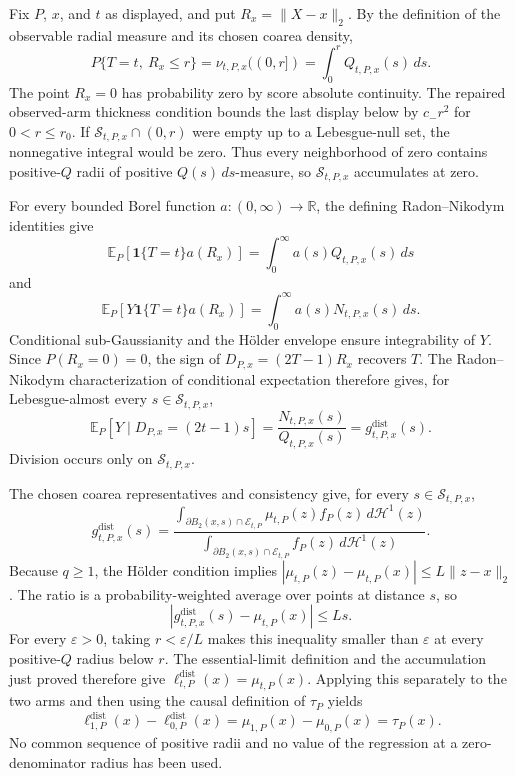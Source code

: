 Fix \(P\), \(x\), and \(t\) as displayed, and put
\(R_x=\lVert X-x\rVert_2\).  By the definition of the observable radial
measure and its chosen coarea density,
\[
 P\{T=t,\ R_x\leq r\}=\nu_{t,P,x}((0,r])
 =\int_0^rQ_{t,P,x}(s)\,ds.
\]
The point \(R_x=0\) has probability zero by score absolute continuity.  The
repaired observed-arm thickness condition bounds the last display below by
\(c_-r^2\) for \(0<r\leq r_0\).  If
\(\mathcal S_{t,P,x}\cap(0,r)\) were empty up to a Lebesgue-null set, the
nonnegative integral would be zero.  Thus every neighborhood of zero contains
positive-\(Q\) radii of positive \(Q(s)\,ds\)-measure, so
\(\mathcal S_{t,P,x}\) accumulates at zero.

For every bounded Borel function \(a:(0,\infty)\to\mathbb R\), the defining
Radon--Nikodym identities give
\[
 \mathbb E_P[\mathbf1\{T=t\}a(R_x)]
 =\int_0^\infty a(s)Q_{t,P,x}(s)\,ds
\]
and
\[
 \mathbb E_P[Y\mathbf1\{T=t\}a(R_x)]
 =\int_0^\infty a(s)N_{t,P,x}(s)\,ds.
\]
Conditional sub-Gaussianity and the H\"older envelope ensure integrability of
\(Y\).  Since \(P(R_x=0)=0\), the sign of
\(D_{P,x}=(2T-1)R_x\) recovers \(T\).  The Radon--Nikodym characterization of
conditional expectation therefore gives, for Lebesgue-almost every
\(s\in\mathcal S_{t,P,x}\),
\[
 \mathbb E_P[Y\mid D_{P,x}=(2t-1)s]
 =\frac{N_{t,P,x}(s)}{Q_{t,P,x}(s)}
 =g^{\mathrm{dist}}_{t,P,x}(s).
\]
Division occurs only on \(\mathcal S_{t,P,x}\).

The chosen coarea representatives and consistency give, for every
\(s\in\mathcal S_{t,P,x}\),
\[
 g^{\mathrm{dist}}_{t,P,x}(s)
 =\frac{\int_{\partial B_2(x,s)\cap\mathcal E_{t,P}}
 \mu_{t,P}(z)f_P(z)\,d\mathcal H^1(z)}
 {\int_{\partial B_2(x,s)\cap\mathcal E_{t,P}}
 f_P(z)\,d\mathcal H^1(z)}.
\]
Because \(q\geq1\), the H\"older condition implies
\(|\mu_{t,P}(z)-\mu_{t,P}(x)|\leq L\lVert z-x\rVert_2\).
The ratio is a probability-weighted average over points at distance \(s\), so
\[
 \left|g^{\mathrm{dist}}_{t,P,x}(s)-\mu_{t,P}(x)\right|
 \leq Ls.
\]
For every \(\varepsilon>0\), taking
\(r<\varepsilon/L\) makes this inequality smaller than \(\varepsilon\) at
every positive-\(Q\) radius below \(r\).  The essential-limit definition and
the accumulation just proved therefore give
\(\ell^{\mathrm{dist}}_{t,P}(x)=\mu_{t,P}(x)\).  Applying this separately to
the two arms and then using the causal definition of \(\tau_P\) yields
\[
 \ell^{\mathrm{dist}}_{1,P}(x)-\ell^{\mathrm{dist}}_{0,P}(x)
 =\mu_{1,P}(x)-\mu_{0,P}(x)=\tau_P(x).
\]
No common sequence of positive radii and no value of the regression at a
zero-denominator radius has been used.